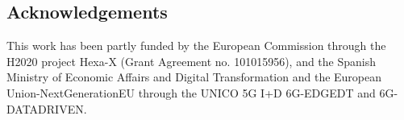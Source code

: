 \documentclass[a0,portrait]{a0poster}
\begin{document}
\begin{multicols}{2}
\section*{Acknowledgements}
This work has been partly funded by the European Commission through the H2020 project Hexa-X (Grant Agreement no. 101015956), and the Spanish Ministry of Economic Affairs and Digital Transformation and the European Union-NextGenerationEU through the UNICO 5G I+D 6G-EDGEDT and 6G-DATADRIVEN.




\end{multicols}
\end{document}
